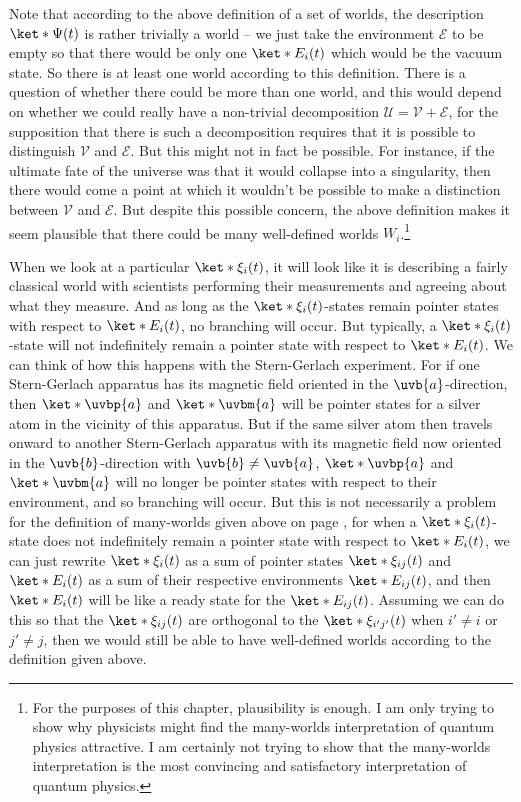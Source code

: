 \documentclass[12pt]{report}
\begin{document}
    Note that according to the above definition of a set of worlds, the description $\ket*{\Psi(t)}$ is rather trivially a world -- we just take the environment $\mathcal{E}$ to be empty so that there would be only one $\ket*{E_i(t)}$ which would be the vacuum state. So there is at least one world according to this definition. There is a question of whether there could be more than one world, and this would depend on whether we could really have a non-trivial decomposition $\mathcal{U}=\mathcal{V}+\mathcal{E}$, 
    for the supposition that there is such a decomposition requires that it is possible to distinguish $\mathcal{V}$ and $\mathcal{E}$. But this might not in fact be possible. For instance, if the ultimate fate of the universe was that it would collapse into a singularity, then there would come a point at which it wouldn't be possible to make a distinction between $\mathcal{V}$ and $\mathcal{E}$. But despite this possible concern, the above definition makes it seem plausible that there could be many well-defined worlds $W_i$.\footnote{For the purposes of this chapter, plausibility is enough. I am only trying to show why physicists might find the many-worlds interpretation of quantum physics attractive. I am certainly not trying to show that the many-worlds interpretation is the most convincing and satisfactory interpretation of quantum physics. }
    
    When we look at a particular $\ket*{\xi_i(t)}$, it will look like it is describing a fairly classical world with scientists performing their measurements and agreeing about what they measure. And as long as the $\ket*{\xi_i(t)}$-states remain pointer states with respect to $\ket*{E_i(t)}$, no branching will occur. But typically, a $\ket*{\xi_i(t)}$-state will not indefinitely remain a pointer state with respect to $\ket*{E_i(t)}$. We can think of how this happens with the Stern-Gerlach experiment. For if one Stern-Gerlach apparatus has its magnetic field oriented in the $\uvb{a}$-direction, then $\ket*{\uvbp{a}}$ and $\ket*{\uvbm{a}}$ will be pointer states for a silver atom in the vicinity of this apparatus. But if the same silver atom then travels onward to another Stern-Gerlach apparatus with its magnetic field now oriented in the $\uvb{b}$-direction with $\uvb{b}\neq\uvb{a}$, $\ket*{\uvbp{a}}$ and $\ket*{\uvbm{a}}$ will no longer be pointer states with respect to their environment, and so branching will occur. But this is not necessarily a problem for the definition of many-worlds given above on page \pageref{rigorousworld}, for when a $\ket*{\xi_i(t)}$-state does not indefinitely remain a pointer state with respect to $\ket*{E_i(t)}$, we can just rewrite $\ket*{\xi_i(t)}$ as a sum of pointer states $\ket*{\xi_{ij}(t)}$ and $\ket*{E_i(t)}$  as a sum of their respective environments $\ket*{E_{ij}(t)}$, and then $\ket*{E_i(t)}$ will be like a ready state for the $\ket*{E_{ij}(t)}$. Assuming we can do this so that the $\ket*{\xi_{ij}(t)}$ are orthogonal to the $\ket*{\xi_{i'j'}(t)}$ when $i'\neq i$ or $j'\neq j$, then we would still be able to have well-defined worlds according to the definition given above. 
\end{document}
